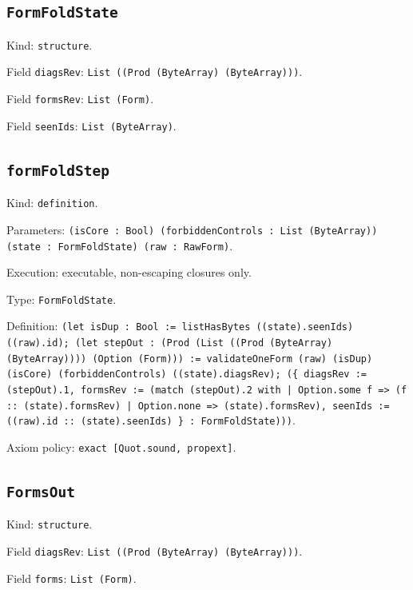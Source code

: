 \documentclass[11pt]{article}
\begin{document}
\subsection*{\texttt{FormFoldState}}
\noindent Kind: \texttt{structure}.\par
\noindent Field \texttt{diagsRev}: \texttt{List ((Prod (ByteArray) (ByteArray)))}.\par
\noindent Field \texttt{formsRev}: \texttt{List (Form)}.\par
\noindent Field \texttt{seenIds}: \texttt{List (ByteArray)}.\par
\subsection*{\texttt{formFoldStep}}
\noindent Kind: \texttt{definition}.\par
\noindent Parameters: \texttt{(isCore : Bool) (forbiddenControls : List (ByteArray)) (state : FormFoldState) (raw : RawForm)}.\par
\noindent Execution: executable, non-escaping closures only.\par
\noindent Type: \texttt{FormFoldState}.\par
\noindent Definition: \texttt{(let isDup : Bool := listHasBytes ((state).seenIds) ((raw).id); (let stepOut : (Prod (List ((Prod (ByteArray) (ByteArray)))) (Option (Form))) := validateOneForm (raw) (isDup) (isCore) (forbiddenControls) ((state).diagsRev); (\{ diagsRev := (stepOut).1, formsRev := (match (stepOut).2 with | Option.some f => (f :: (state).formsRev) | Option.none => (state).formsRev), seenIds := ((raw).id :: (state).seenIds) \} : FormFoldState)))}.\par
\noindent Axiom policy: \texttt{exact [Quot.sound, propext]}.\par
\subsection*{\texttt{FormsOut}}
\noindent Kind: \texttt{structure}.\par
\noindent Field \texttt{diagsRev}: \texttt{List ((Prod (ByteArray) (ByteArray)))}.\par
\noindent Field \texttt{forms}: \texttt{List (Form)}.\par
\end{document}
